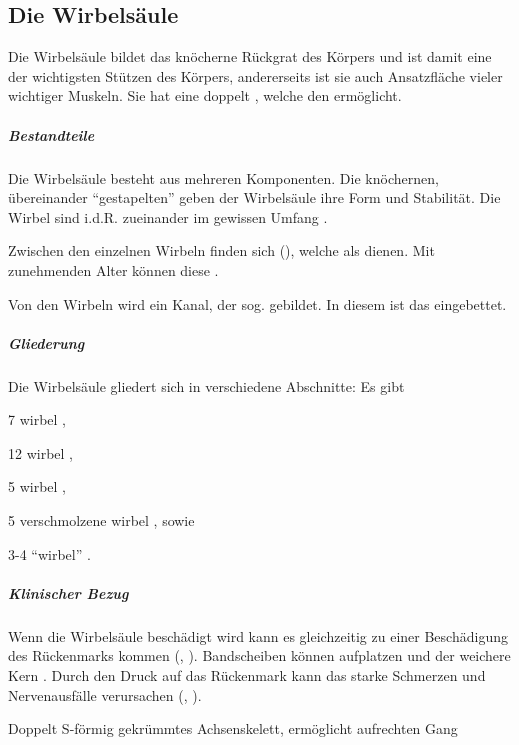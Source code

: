 \subsection{Die Wirbelsäule}
{%
Die Wirbelsäule bildet das knöcherne Rückgrat des Körpers und ist damit eine
der wichtigsten Stützen des Körpers, andererseits ist sie auch Ansatzfläche
vieler wichtiger Muskeln. Sie hat eine doppelt ,
welche den  ermöglicht.

\subparagraph{Bestandteile}
Die Wirbelsäule besteht aus mehreren Komponenten. Die knöchernen, übereinander
"`gestapelten"'   geben der Wirbelsäule ihre Form
und Stabilität. Die Wirbel sind i.d.R. zueinander im gewissen Umfang
.

Zwischen den
einzelnen Wirbeln finden sich 
(), welche als  dienen. Mit zunehmenden Alter können
diese . 
    
Von den Wirbeln wird ein Kanal, der sog. 
gebildet. In diesem ist das  eingebettet.

\subparagraph{Gliederung} Die Wirbelsäule gliedert sich in verschiedene
Abschnitte: 
Es gibt 
\begin{inparaitem}
    \item 7 wirbel ,
    \item 12 wirbel  ,
    \item 5 wirbel  ,
    \item 5 verschmolzene wirbel , sowie
    \item 3-4 "`wirbel"' .
\end{inparaitem}

\subparagraph{Klinischer Bezug} Wenn die Wirbelsäule beschädigt wird kann es
gleichzeitig zu einer Beschädigung des Rückenmarks kommen
(, ). Bandscheiben
können aufplatzen und der weichere Kern . Durch
den Druck auf das Rückenmark kann das starke Schmerzen und
Nervenausfälle verursachen (,
).


}{%
Doppelt S-förmig gekrümmtes
Achsenskelett, ermöglicht  aufrechten Gang 

}
